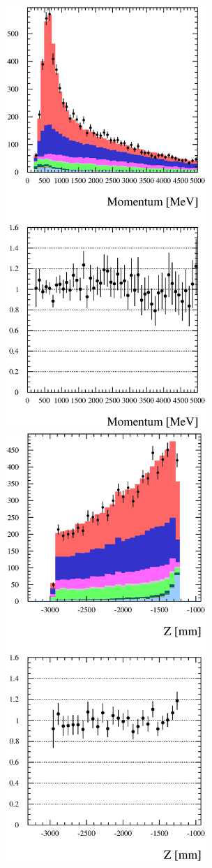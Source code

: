 \begin{figure}[h]
  \centering
  \includegraphics[width=3in]{Figures/P0DTrackerMomRun1Run2-normByRatio.eps}
  \includegraphics[width=3in]{Figures/P0DTrkZRun1Run2-normByRatio.eps}

\end{figure}
